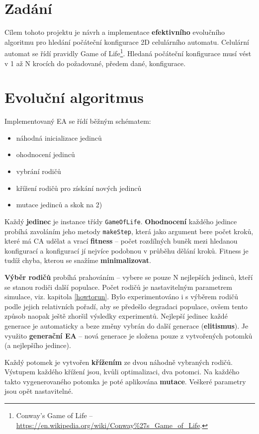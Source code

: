 \documentclass[12pt]{article}
\begin{document}
\afterpage{\cfoot{\thepage }}

\section{Zadání}
Cílem tohoto projektu je návrh a implementace \textbf{efektivního} evolučního algoritmu pro hledání počáteční konfigurace 2D celulárního automatu. Celulární automat se řídí pravidly Game of Life\footnote{Conway's Game of Life -- \url{https://en.wikipedia.org/wiki/Conway\%27s\_Game\_of\_Life}.}. Hledaná počáteční konfigurace musí vést v 1 až N krocích do požadované, předem dané, konfigurace.

\section{Evoluční algoritmus}
Implementovaný EA se řídí běžným schématem:
\begin{itemize}
    \item[1)] náhodná inicializace jedinců
    \item[2)] ohodnocení jedinců
    \item[3)] vybrání rodičů
    \item[4)] křížení rodičů pro získání nových jedinců
    \item[5)] mutace jedinců a skok na 2)
\end{itemize}
Každý \textbf{jedinec} je instance třídy \texttt{GameOfLife}. \textbf{Ohodnocení} každého jedince probíhá zavoláním jeho metody \texttt{makeStep}, která jako argument bere počet kroků, které má CA udělat a vrací \textbf{fitness} -- počet rozdílných buněk mezi hledanou konfigurací a konfigurací jí nejvíce podobnou v průběhu dělání kroků. Fitness je tudíž chyba, kterou se snažíme \textbf{minimalizovat}. 

\textbf{Výběr rodičů} probíhá prahováním -- vybere se pouze N nejlepších jedinců, kteří se stanou rodiči další populace. Počet rodičů je nastavitelným parametrem simulace, viz. kapitola \ref{howtorun}. Bylo experimentováno i s výběrem rodičů podle jejich relativních pořadí, aby se předešlo degradaci populace, ovšem tento způsob naopak ještě zhoršil výsledky experimentů. Nejlepší jedinec každé generace je automaticky a beze změny vybrán do další generace (\textbf{elitismus}). Je využito \textbf{generační EA} -- nová generace je složena pouze z vytvořených potomků (a nejlepšího jedince).

Každý potomek je vytvořen \textbf{křížením} ze dvou náhodně vybraných rodičů. Výstupem každého křížení jsou, kvůli optimalizaci, dva potomci. Na každého takto vygenerovaného potomka je poté aplikována \textbf{mutace}. Veškeré parametry jsou opět nastavitelné.
\end{document}

